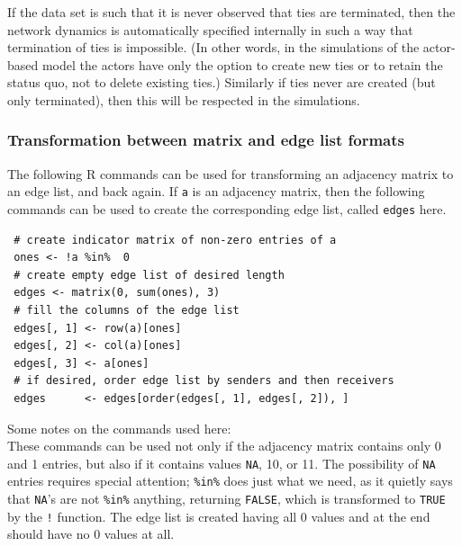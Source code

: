 \documentclass[a4paper,fleqn,11pt]{article}
\newcommand{\+}{\, + \,}
\newcommand{\R}{{\sf R }}
\begin{document}
{If the data set is such that it is never observed that ties are terminated,
then the network dynamics is automatically specified internally in such a way
that termination of ties is impossible.
(In other words, in the simulations of the actor-based model
the actors have only the option to create new ties or to retain
the status quo, not to delete existing ties.)
Similarly if ties never are created (but only terminated),
then this will be respected in the simulations.

\subsubsection{Transformation between matrix and edge list formats}
\label{S_trafos}

The following \R commands can be used for transforming an
adjacency matrix to an edge list, and back again.
If \texttt{a} is an adjacency matrix, then the following commands
can be used to create the corresponding edge list,
called \texttt{edges} here.
 \begin{verbatim}
 # create indicator matrix of non-zero entries of a
 ones <- !a %in%  0
 # create empty edge list of desired length
 edges <- matrix(0, sum(ones), 3)
 # fill the columns of the edge list
 edges[, 1] <- row(a)[ones]
 edges[, 2] <- col(a)[ones]
 edges[, 3] <- a[ones]
 # if desired, order edge list by senders and then receivers
 edges      <- edges[order(edges[, 1], edges[, 2]), ]
 \end{verbatim}
Some notes on the commands used here:\\
These commands can be used not only if the adjacency matrix
contains only 0 and 1 entries, but also if it contains values
\texttt{NA}, 10, or 11. The possibility of \texttt{NA}
entries requires special attention;
\texttt{\%in\%}
does just what we need, as it quietly says that
\texttt{NA}'s are not \texttt{\%in\%}
anything, returning \texttt{FALSE}, which is transformed to
\texttt{TRUE} by the \texttt{!} function.
The edge list is created having all 0 values and at the end
should have no 0 values at all.

}
\end{document}
